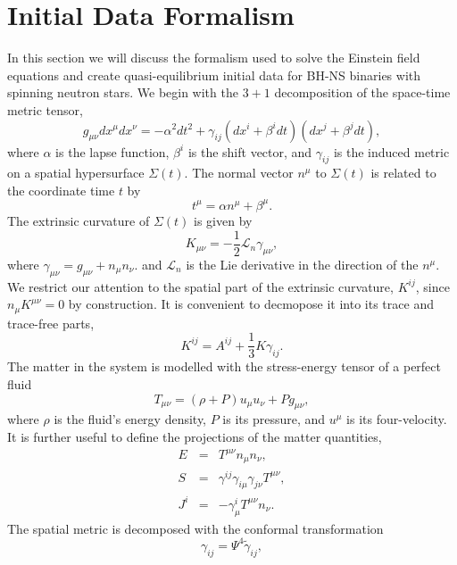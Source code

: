 \section{Initial Data Formalism}
\label{sec:IDF}
In this section we will discuss the formalism used to solve the
Einstein field equations and create quasi-equilibrium initial data for
BH-NS binaries with spinning neutron
stars. We begin with the $3+1$ decomposition of the space-time metric
tensor,
\begin{equation}
g_{\mu\nu}dx^{\mu}dx^{\nu} = -\alpha^2dt^2 + \gamma_{ij}\left(dx^i +
  \beta^idt\right)\left(dx^j+\beta^jdt\right),
\end{equation}
where $\alpha$ is the lapse function, $\beta^i$ is the shift vector,
and $\gamma_{ij}$ is the induced metric on a spatial hypersurface
$\Sigma(t)$. The normal vector $n^{\mu}$ to $\Sigma(t)$ is related to
the coordinate time $t$ by
\begin{equation}
t^{\mu} = \alpha n^{\mu} + \beta^{\mu}.
\end{equation}
The extrinsic curvature of $\Sigma(t)$ is given by
\begin{equation}
K_{\mu\nu} = -\frac{1}{2}\mathcal{L}_n\gamma_{\mu\nu},
\end{equation}
where $\gamma_{\mu\nu}=g_{\mu\nu}+n_{\mu}n_{\nu}.$ and $\mathcal{L}_n$
is the Lie derivative in the direction of the $n^{\mu}$. We restrict our
attention to the spatial part of the extrinsic curvature, $K^{ij}$,
since $n_{\mu}K^{\mu\nu}=0$ by construction. It is convenient to
decmopose it into its trace and trace-free parts,
\begin{equation}
K^{ij} = A^{ij}+\frac{1}{3}K\gamma_{ij}.
\end{equation}
The matter in the system is modelled with the stress-energy tensor of
a perfect fluid 
\begin{equation}
T_{\mu\nu}=\left(\rho+P\right)u_{\mu}u_{\nu}+Pg_{\mu\nu},
\end{equation}
where $\rho$ is the fluid's energy density, $P$ is its pressure, and
$u^{\mu}$ is its four-velocity. It is further useful to define the
projections of the matter quantities,
\begin{eqnarray}
E &=& T^{\mu\nu}n_{\mu}n_{\nu},\\
S &=& \gamma^{ij}\gamma_{i\mu}\gamma_{j\nu}T^{\mu\nu}, \\
J^i &=& -\gamma^{i}_{\mu}T^{\mu\nu}n_{\nu}.
\end{eqnarray}
The spatial metric is decomposed with the conformal transformation
\begin{equation}
\gamma_{ij}=\Psi^4\tilde{\gamma}_{ij},
\end{equation}
